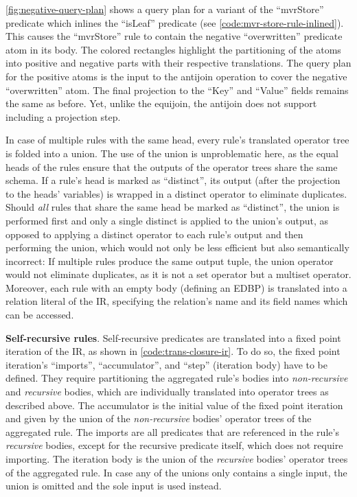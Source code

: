 \ref{fig:negative-query-plan} shows a query plan for a variant of the
``mvrStore'' predicate which inlines the ``isLeaf'' predicate
(see \ref{code:mvr-store-rule-inlined}).
This causes the ``mvrStore'' rule to contain the negative ``overwritten''
predicate atom in its body.
The colored rectangles highlight the partitioning of the atoms into positive
and negative parts with their respective translations.
The query plan for the positive atoms is the input to the antijoin operation
to cover the negative ``overwritten'' atom.
The final projection to the ``Key'' and ``Value'' fields remains the same as
before.
Yet, unlike the equijoin, the antijoin does not support including a projection
step.

In case of multiple rules with the same head,
every rule's translated operator tree is folded into a union.
The use of the union is unproblematic here, as the equal heads of the rules
ensure that the outputs of the operator trees share the same schema.
If a rule's head is marked as ``distinct'', its output (after the projection
to the heads' variables) is wrapped in a distinct operator to eliminate
duplicates.
Should \emph{all} rules that share the same head be marked as ``distinct'',
the union is performed first and only a single distinct is applied to the union's
output, as opposed to applying a distinct operator to each rule's output and
then performing the union, which would not only be less efficient but also
semantically incorrect:
If multiple rules produce the same output tuple, the union operator would
not eliminate duplicates, as it is not a set operator but a multiset operator.
Moreover, each rule with an empty body (defining an \ac{EDBP})
is translated into a relation literal of the \ac{IR},
specifying the relation's name and its field names which can be accessed.

\textbf{Self-recursive rules}.
Self-recursive predicates are translated into a fixed point iteration of the \ac{IR},
as shown in \ref{code:trans-closure-ir}.
To do so, the fixed point iteration's ``imports'', ``accumulator'', and ``step''
(iteration body) have to be defined.
They require partitioning the aggregated rule's bodies into \emph{non-recursive}
and \emph{recursive} bodies, which are individually translated into operator trees
as described above.
The accumulator is the initial value of the fixed point iteration and given by
the union of the \emph{non-recursive} bodies' operator trees of the aggregated rule.
The imports are all predicates that are referenced in the rule's \emph{recursive}
bodies, except for the recursive predicate itself, which does not require importing.
The iteration body is the union of the \emph{recursive} bodies' operator trees
of the aggregated rule.
In case any of the unions only contains a single input, the union is omitted
and the sole input is used instead.


